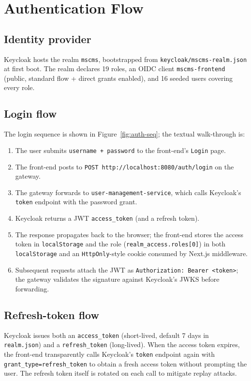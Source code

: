 \documentclass[12pt,a4paper,oneside]{report}
\begin{document}
\section{Authentication Flow}
\label{sec:auth}

\subsection{Identity provider}
Keycloak hosts the realm \texttt{mscms}, bootstrapped from
\texttt{keycloak/mscms-realm.json} at first boot. The realm declares 19
roles, an OIDC client \texttt{mscms-frontend} (public, standard flow +
direct grants enabled), and 16 seeded users covering every role.

\subsection{Login flow}
The login sequence is shown in Figure~\ref{fig:auth-seq}; the textual
walk-through is:

\begin{enumerate}[leftmargin=*]
  \item The user submits \texttt{username + password} to the
        front-end's \texttt{Login} page.
  \item The front-end posts to \texttt{POST http://localhost:8080/auth/login}
        on the gateway.
  \item The gateway forwards to \texttt{user-management-service}, which calls
        Keycloak's \texttt{token} endpoint with the password grant.
  \item Keycloak returns a JWT \texttt{access\_token} (and a refresh token).
  \item The response propagates back to the browser; the front-end stores
        the access token in \texttt{localStorage} and the role
        (\texttt{realm\_access.roles[0]}) in both \texttt{localStorage} and
        an \texttt{HttpOnly}-style cookie consumed by Next.js middleware.
  \item Subsequent requests attach the JWT as
        \texttt{Authorization: Bearer <token>}; the gateway validates the
        signature against Keycloak's JWKS before forwarding.
\end{enumerate}

\subsection{Refresh-token flow}
Keycloak issues both an \texttt{access\_token} (short-lived,
default 7 days in \texttt{realm.json}) and a \texttt{refresh\_token}
(long-lived). When the access token expires, the front-end transparently
calls Keycloak's \texttt{token} endpoint again with
\texttt{grant\_type=refresh\_token} to obtain a fresh access token without
prompting the user. The refresh token itself is rotated on each call to
mitigate replay attacks.
\end{document}
